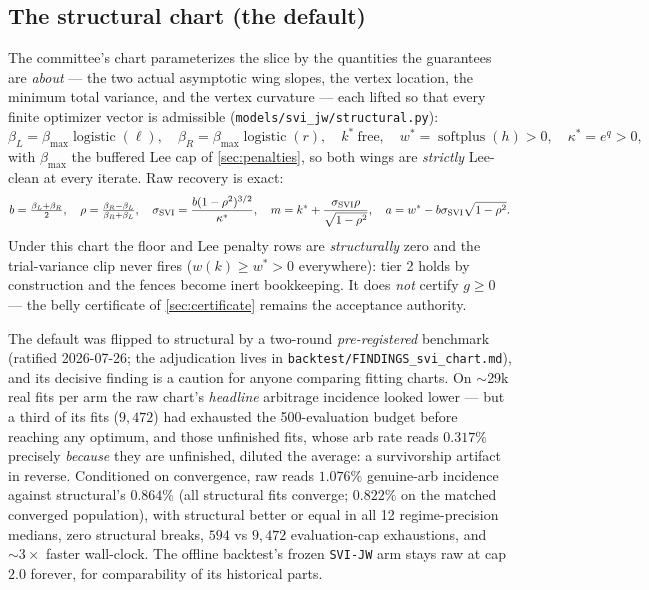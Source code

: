 \documentclass[11pt]{article}
\begin{document}
\subsection{The structural chart (the default)}
\label{sec:structural}

The committee's chart parameterizes the slice by the quantities the
guarantees are \emph{about} --- the two actual asymptotic wing slopes, the
vertex location, the minimum total variance, and the vertex curvature ---
each lifted so that every finite optimizer vector is admissible
(\texttt{models/svi\_jw/structural.py}):
\begin{equation}
\beta_L=\beta_{\max}\operatorname{logistic}(\ell),\quad
\beta_R=\beta_{\max}\operatorname{logistic}(r),\quad
k^*\ \text{free},\quad
w^*=\operatorname{softplus}(h)>0,\quad
\kappa^*=e^{q}>0,
\label{eq:structural}
\end{equation}
with $\beta_{\max}$ the buffered Lee cap of \cref{sec:penalties}, so both
wings are \emph{strictly} Lee-clean at every iterate. Raw recovery is exact:
\begin{equation}
b=\tfrac{\beta_L+\beta_R}{2},\quad
\rho=\tfrac{\beta_R-\beta_L}{\beta_R+\beta_L},\quad
\sigma_{\mathrm{SVI}}=\frac{b(1-\rho^2)^{3/2}}{\kappa^*},\quad
m=k^*+\frac{\sigma_{\mathrm{SVI}}\rho}{\sqrt{1-\rho^2}},\quad
a=w^*-b\sigma_{\mathrm{SVI}}\sqrt{1-\rho^2}.
\label{eq:structural_inverse}
\end{equation}
Under this chart the floor and Lee penalty rows are \emph{structurally} zero
and the trial-variance clip never fires ($w(k)\ge w^*>0$ everywhere): tier 2
holds by construction and the fences become inert bookkeeping. It does
\emph{not} certify $g\ge0$ --- the belly certificate of
\cref{sec:certificate} remains the acceptance authority.

The default was flipped to structural by a two-round \emph{pre-registered}
benchmark (ratified 2026-07-26; the adjudication lives in
\nolinkurl{backtest/FINDINGS_svi_chart.md}), and its decisive finding is a
caution for anyone comparing fitting charts.
On $\sim$29k real fits per arm the raw chart's \emph{headline} arbitrage
incidence looked lower --- but a third of its fits ($9{,}472$) had exhausted
the 500-evaluation budget before reaching any optimum, and those unfinished
fits, whose arb rate reads $0.317\%$ precisely \emph{because} they are
unfinished, diluted the average: a survivorship artifact in reverse.
Conditioned on convergence, raw reads $1.076\%$ genuine-arb incidence against
structural's $0.864\%$ (all structural fits converge; $0.822\%$ on the
matched converged population), with structural better or equal in all 12
regime-precision medians, zero structural breaks, $594$ vs $9{,}472$
evaluation-cap exhaustions, and $\sim3\times$ faster wall-clock. The offline
backtest's frozen \texttt{SVI-JW} arm stays raw at cap $2.0$ forever, for
comparability of its historical parts.
\end{document}
